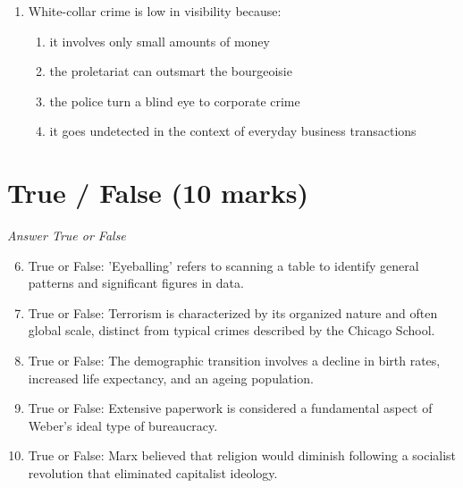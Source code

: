 \documentclass[12pt]{article}
\begin{document}
\begin{enumerate}[label=\arabic*.]
\begin{enumerate}[label=(\alph*)]
    \item testing out new research methods to see which one works best
    \item isolating and measuring the effect of one variable upon another
    \item using personal beliefs and values to decide what to study
    \item interpreting data subjectively, drawing on theoretical paradigms
\end{enumerate}
\item White-collar crime is low in visibility because:
\begin{enumerate}[label=(\alph*)]
    \item it involves only small amounts of money
    \item the proletariat can outsmart the bourgeoisie
    \item the police turn a blind eye to corporate crime
    \item it goes undetected in the context of everyday business transactions
\end{enumerate}
\end{enumerate}

\section*{True / False (10 marks)}
\textit{Answer True or False}
\begin{enumerate}[label=\arabic*.]
\setcounter{enumi}{5}
\item True or False: 'Eyeballing' refers to scanning a table to identify general patterns and significant figures in data.
\item True or False: Terrorism is characterized by its organized nature and often global scale, distinct from typical crimes described by the Chicago School.
\item True or False: The demographic transition involves a decline in birth rates, increased life expectancy, and an ageing population.
\item True or False: Extensive paperwork is considered a fundamental aspect of Weber's ideal type of bureaucracy.
\item True or False: Marx believed that religion would diminish following a socialist revolution that eliminated capitalist ideology.
\end{enumerate}
\end{document}
